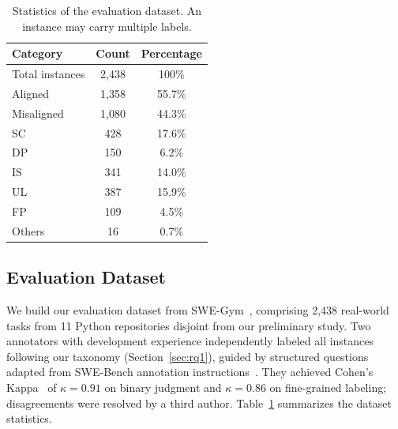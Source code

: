 \documentclass[sigconf, review, anonymous]{acmart}
\begin{document}
    \begin{table}[!t]
        \centering
        \caption{Statistics of the evaluation dataset. An instance may carry multiple labels.}
        \label{tab:eval_dataset}
        \begin{tabular}{lcc}
            \toprule \textbf{Category} & \textbf{Count} & \textbf{Percentage} \\
            \midrule Total instances   & 2{,}438        & 100\%               \\
            Aligned                    & 1{,}358        & 55.7\%              \\
            Misaligned                 & 1{,}080        & 44.3\%              \\
            \midrule
            \quad SC                   & 428            & 17.6\%              \\
            \quad DP                   & 150            & 6.2\%               \\
            \quad IS                   & 341            & 14.0\%              \\
            \quad UL                   & 387            & 15.9\%              \\
            \quad FP                   & 109            & 4.5\%               \\
            \quad Others               & 16             & 0.7\%               \\
            \bottomrule
        \end{tabular}
    \end{table}
    
    \subsection{Evaluation Dataset}
    \label{sec:eval_dataset}


  We build our evaluation dataset from SWE-Gym~\cite{swegym},
   comprising 2,438 real-world tasks from 11 Python repositories disjoint 
  from our preliminary study. Two annotators with development 
  experience independently labeled all instances following our 
  taxonomy (Section~\ref{sec:rq1}), guided by structured 
  questions adapted from SWE-Bench annotation                  
  instructions~\cite{annotation_instruction}. They achieved 
  Cohen's Kappa~\cite{kappa} of $\kappa = 0.91$ on binary      
  judgment and $\kappa = 0.86$ on fine-grained labeling; 
  disagreements were resolved by a third author. 
  Table~\ref{tab:eval_dataset} summarizes the dataset
  statistics.
\end{document}
